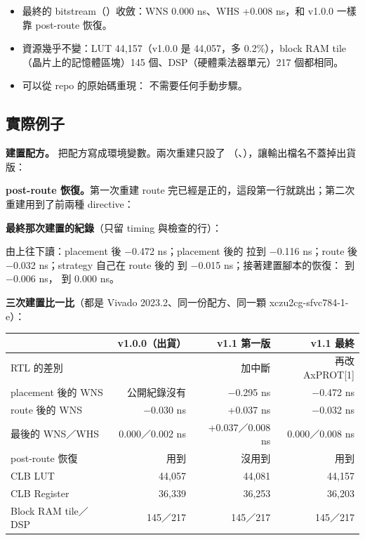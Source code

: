 \begin{gain}
\begin{itemize}
\item 最終的 bitstream（）收斂：WNS 0.000 ns、WHS +0.008 ns，和 v1.0.0 一樣靠 post-route 恢復。
\item 資源幾乎不變：LUT 44,157（v1.0.0 是 44,057，多 0.2\%），block RAM tile（晶片上的記憶體區塊）145 個、DSP（硬體乘法器單元）217 個都相同。
\item 可以從 repo 的原始碼重現： 不需要任何手動步驟。
\end{itemize}
\end{gain}

\subsection{實際例子}

\textbf{建置配方。} 把配方寫成環境變數。兩次重建只設了 （、），讓輸出檔名不蓋掉出貨版：


\textbf{post-route 恢復。}第一次重建 route 完已經是正的，這段第一行就跳出；第二次重建用到了前兩種 directive：


\textbf{最終那次建置的紀錄}（只留 timing 與檢查的行）：


由上往下讀：placement 後 $-$0.472 ns；placement 後的  拉到 $-$0.116 ns；route 後 $-$0.032 ns；strategy 自己在 route 後的  到 $-$0.015 ns；接著建置腳本的恢復： 到 $-$0.006 ns， 到 0.000 ns。

\textbf{三次建置比一比}（都是 Vivado 2023.2、同一份配方、同一顆 xczu2cg-sfvc784-1-e）：

\begin{center}
\small
\begin{tabularx}{\textwidth}{X r r r}
\toprule
 & v1.0.0（出貨） & v1.1 第一版 & v1.1 最終 \\
\midrule
RTL 的差別 & & 加中斷 & 再改 AxPROT[1] \\
placement 後的 WNS & 公開紀錄沒有 & $-$0.295 ns & $-$0.472 ns \\
route 後的 WNS & $-$0.030 ns & +0.037 ns & $-$0.032 ns \\
最後的 WNS／WHS & 0.000／0.002 ns & +0.037／0.008 ns & 0.000／0.008 ns \\
post-route 恢復 & 用到 & 沒用到 & 用到 \\
CLB LUT & 44,057 & 44,081 & 44,157 \\
CLB Register & 36,339 & 36,253 & 36,203 \\
Block RAM tile／DSP & 145／217 & 145／217 & 145／217 \\
\bottomrule
\end{tabularx}
\end{center}

